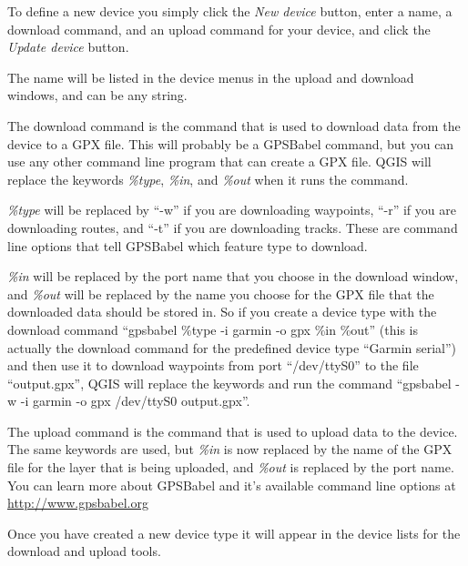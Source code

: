 To define a new device you simply click the \emph{New device} button,
enter a name, a download command, and an upload command for your device,
and click the \emph{Update device} button. 

The name will be listed in the device menus in the upload and download
windows, and can be any string. 

The download command is the command that is used to download data
from the device to a GPX file. This will probably be a GPSBabel command,
but you can use any other command line program that can create a GPX
file. QGIS will replace the keywords \emph{\%type}, \emph{\%in}, and
\emph{\%out} when it runs the command.

\emph{\%type} will be replaced by {}``-w'' if you are downloading
waypoints, {}``-r'' if you are downloading routes, and {}``-t''
if you are downloading tracks. These are command line options that
tell GPSBabel which feature type to download. 

\emph{\%in} will be replaced by the port name that you choose in the
download window, and \emph{\%out} will be replaced by the name you
choose for the GPX file that the downloaded data should be stored
in. So if you create a device type with the download command {}``gpsbabel
\%type -i garmin -o gpx \%in \%out'' (this is actually the download
command for the predefined device type {}``Garmin serial'') and
then use it to download waypoints from port {}``/dev/ttyS0'' to
the file {}``output.gpx'', QGIS will replace the keywords and run
the command {}``gpsbabel -w -i garmin -o gpx /dev/ttyS0 output.gpx''.

The upload command is the command that is used to upload data to the
device. The same keywords are used, but \emph{\%in} is now replaced
by the name of the GPX file for the layer that is being uploaded,
and \emph{\%out} is replaced by the port name. You can learn more
about GPSBabel and it's available command line options at \url{http://www.gpsbabel.org}

Once you have created a new device type it will appear in the device
lists for the download and upload tools.